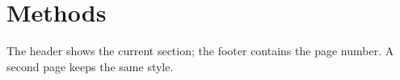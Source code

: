 \documentclass{article}
\begin{document}
\section{Methods}The header shows the current section; the footer contains the page number.
\newpage A second page keeps the same style.
\end{document}

